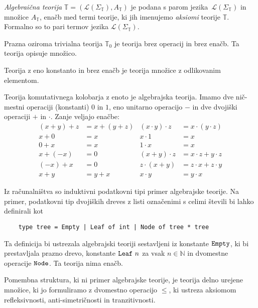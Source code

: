\documentclass[../kategoricna_logika.tex]{subfiles}
\begin{document}
%
\begin{definicija}
  \emph{Algebraična teorija}
  $\mathbb{T} = (\mathcal{L}(\Sigma_\mathbb{T}), A_\mathbb{T})$ je podana s parom
  jezika~$\mathcal{L}(\Sigma_\mathbb{T})$ in množice $A_\mathbb{T}$, enačb med termi
  teorije, ki jih imenujemo \emph{aksiomi} teorije $\mathbb{T}$. Formalno so
  to pari termov jezika $\mathcal{L}(\Sigma_{\mathbb{T}})$.
\end{definicija}
\begin{primer}
  Prazna oziroma trivialna teorija $\mathbb{T}_0$ je teorija brez operacij in brez enačb.
  Ta teorija opisuje množico.
\end{primer}
\begin{primer}
Teorija z eno konstanto in brez enačb je teorija množice z odlikovanim elementom.
\end{primer}
\begin{primer}
  Teorija komutativnega kolobarja z enoto je algebrajska teorija.
  Imamo dve nič-mestni operaciji (konstanti) $0$ in $1$, eno unitarno operacijo
  $-$ in dve dvojiški operaciji $+$ in $\cdot$. Zanje veljajo enačbe:
\begin{align*}
  (x+y)+z &= x + (y + z) & (x \cdot y) \cdot z &= x \cdot (y \cdot z) \\
  x + 0 &= x & x \cdot 1 &= x \\
  0 + x &= x & 1\cdot x &= x \\
  x + (-x) &= 0 & (x+y)\cdot z &= x \cdot z + y\cdot z \\
  (-x) + x &= 0 & z \cdot (x+y) &= z \cdot x+ z\cdot y \\
  x + y &= y + x & x \cdot y &= y\cdot x
\end{align*}
\end{primer}
\begin{primer}
  Iz računalništva so induktivni podatkovni tipi primer algebrajske teorije.
  Na primer, podatkovni tip dvojiških dreves z listi označenimi s celimi števili
  bi lahko definirali kot
  \begin{verbatim}
    type tree = Empty | Leaf of int | Node of tree * tree
  \end{verbatim}
  Ta definicija bi ustrezala algebrajski teoriji sestavljeni iz konstante $\verb|Empty|$,
  ki bi prestavljala prazno drevo, konstante $\verb|Leaf| \  n$ za vsak $n \in \mathbb{N}$
  in dvomestne operacije $\verb|Node|$. Ta teorija nima enačb. 
\end{primer}
\begin{primer}
  Pomembna struktura, ki ni primer algebrajske teorije, je teorija delno urejene množice,
  ki jo formuliramo z dvomestno operacijo $\leq$, ki ustreza aksiomom refleksivnosti,
  anti-simetričnosti in tranzitivnosti.
\end{primer}
%
%
\end{document}
